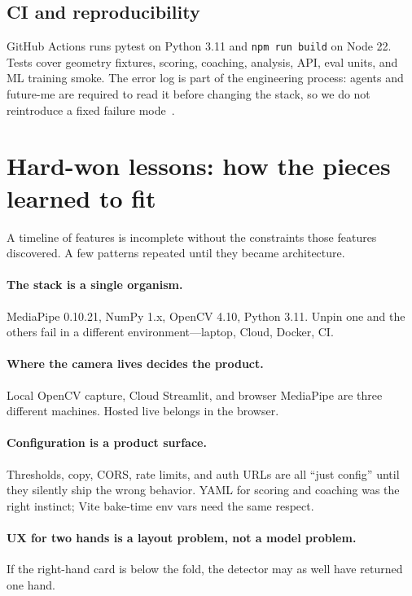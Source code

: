 \documentclass[11pt,a4paper]{article}
\newcommand{\code}[1]{\texttt{#1}}
\begin{document}
\subsection{CI and reproducibility}

GitHub Actions runs pytest on Python 3.11 and \code{npm run build} on Node 22.
Tests cover geometry fixtures, scoring, coaching, analysis, API, eval units, and ML training smoke.
The error log is part of the engineering process: agents and future-me are required to read it before changing the stack, so we do not reintroduce a fixed failure mode~\cite{errors}.

\section{Hard-won lessons: how the pieces learned to fit}
\label{sec:lessons}

A timeline of features is incomplete without the constraints those features discovered.
A few patterns repeated until they became architecture.

\paragraph{The stack is a single organism.}
MediaPipe 0.10.21, NumPy 1.x, OpenCV 4.10, Python 3.11.
Unpin one and the others fail in a different environment---laptop, Cloud, Docker, CI.

\paragraph{Where the camera lives decides the product.}
Local OpenCV capture, Cloud Streamlit, and browser MediaPipe are three different machines.
Hosted live belongs in the browser.

\paragraph{Configuration is a product surface.}
Thresholds, copy, CORS, rate limits, and auth URLs are all \enquote{just config} until they silently ship the wrong behavior.
YAML for scoring and coaching was the right instinct; Vite bake-time env vars need the same respect.

\paragraph{UX for two hands is a layout problem, not a model problem.}
If the right-hand card is below the fold, the detector may as well have returned one hand.
\end{document}
